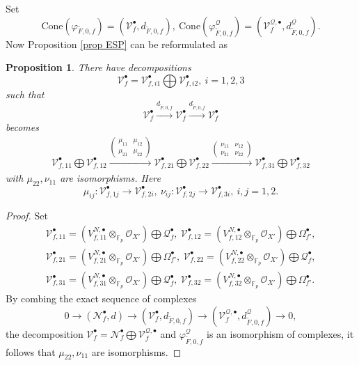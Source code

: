 \documentclass[12pt, a4paper]{article}
\newtheorem{proposition}{Proposition}[section]
\begin{document}
Set 
$$\mathrm{Cone}(\varphi_{\tilde F,0,f})=(\mathcal V_f^\bullet,d_{\tilde F,0,f}),~\mathrm{Cone}(\varphi^\mathcal{Q}_{\tilde F,0,f})=(\mathcal V_f^{\mathcal Q,\bullet},d^{\mathcal Q}_{\tilde F,0,f}).
$$
Now Proposition \ref{prop ESP} can be reformulated as
\begin{proposition}\label{ESP decomp}
 There have decompositions
$$
\mathcal V_f^\bullet=\mathcal V^\bullet_{f,i1}\bigoplus \mathcal V^\bullet_{f,i2},~i=1,2,3$$
such that 
$$
\mathcal V_f^\bullet\xrightarrow{d_{\tilde F,0,f}}\mathcal V_f^\bullet\xrightarrow{d_{\tilde F,0,f}}\mathcal V_f^\bullet
$$
becomes
\begin{eqnarray}\label{decomposable exact}
\mathcal V^\bullet_{f,11}\bigoplus \mathcal V^\bullet_{f,12}\xrightarrow{ \left(\begin{matrix}\mu_{11}&\mu_{12}\\
\mu_{21}&\mu_{22}\end{matrix}\right)}\mathcal V^\bullet_{f,21}\bigoplus \mathcal V^\bullet_{f,22}\xrightarrow{ \left(\begin{matrix}\nu_{11}&\nu_{12}\\
\nu_{21}&\nu_{22}\end{matrix}\right)}\mathcal V^\bullet_{f,31}\bigoplus \mathcal V^\bullet_{f,32}	\end{eqnarray}	
with $\mu_{22},\nu_{11}$	are isomorphisms. Here
$$
\mu_{ij}:\mathcal V^\bullet_{f,1j}\to \mathcal V^\bullet_{f,2i},~\nu_{ij}:\mathcal V^\bullet_{f,2j}\to \mathcal V^\bullet_{f,3i},~i,j=1,2.
$$	
\end{proposition}
\begin{proof}
Set
$$
\begin{array}{c}
\mathcal V^\bullet_{f,11}=(V^{N,\bullet}_{f,11}\otimes_{\mathbb F_p}\mathcal O_{X'})\bigoplus\mathcal Q^\bullet_f,~\mathcal V^\bullet_{f,12}=(V^{N,\bullet}_{f,12}\otimes_{\mathbb F_p}\mathcal O_{X'})\bigoplus\Omega^\bullet_{f'},\\
\mathcal V^\bullet_{f,21}=(V^{N,\bullet}_{f,21}\otimes_{\mathbb F_p}\mathcal O_{X'})\bigoplus\Omega^\bullet_{f'},~\mathcal V^\bullet_{f,22}=(V^{N,\bullet}_{f,22}\otimes_{\mathbb F_p}\mathcal O_{X'})\bigoplus\mathcal Q^\bullet_f,\\
\mathcal V^\bullet_{f,31}=(V^{N,\bullet}_{f,31}\otimes_{\mathbb F_p}\mathcal O_{X'})\bigoplus\mathcal Q^\bullet_f,~\mathcal V^\bullet_{f,32}=(V^{N,\bullet}_{f,32}\otimes_{\mathbb F_p}\mathcal O_{X'})\bigoplus\Omega^\bullet_{f'}.
\end{array}
$$
By combing the exact sequence of complexes
$$
0\to(\mathcal N^\bullet_f,d)\to(\mathcal V_f^\bullet,d_{\tilde F,0,f})\to(\mathcal V_f^{\mathcal Q,\bullet},d^{\mathcal Q}_{\tilde F,0,f})\to0,$$
the decomposition $\mathcal V_f^\bullet=\mathcal N^\bullet_f\bigoplus\mathcal V_f^{\mathcal Q,\bullet}$ and $\varphi^\mathcal{Q}_{\tilde F,0,f}$ is an isomorphism of complexes, it follows that $\mu_{22},\nu_{11}$ are isomorphisms.
\end{proof}
\end{document}
